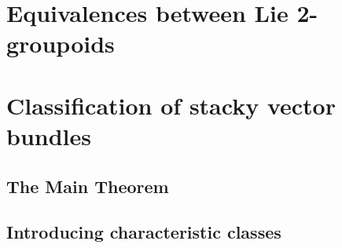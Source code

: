 


\chapter{Equivalences between Lie 2-groupoids}\label{ch:equivalences}










\chapter{Classification of stacky vector bundles}\label{ch:main-thm}



\section{The Main Theorem}



\section{Introducing characteristic classes}

